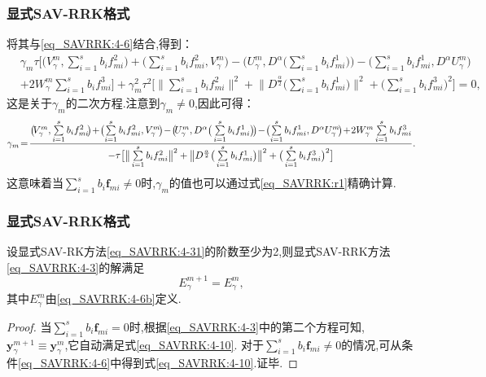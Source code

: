 \documentclass[aspectratio=169]{beamer}
\numberwithin{theorem}{section} %
\begin{document}
\begin{frame}\frametitle{显式SAV-RRK格式}
	将其与\eqref{eq_SAVRRK:4-6}结合,得到：
	\begin{align*}
	&\gamma_m\tau\big[\big(V_{\gamma}^{m},\sum\limits_{i=1}^{s}b_if_{mi}^2\big)+\big(\sum\limits_{i=1}^{s}b_if_{mi}^2,V_{\gamma}^{m}\big)-\big(U_{\gamma}^{m},D^{\alpha}\big(\sum\limits_{i=1}^{s}b_if_{mi}^1\big)\big)-\big(\sum\limits_{i=1}^{s}b_if_{mi}^1, D^{\alpha} U_{\gamma}^{m}\big)\\
	&+2W_{\gamma}^{m}\sum\limits_{i=1}^{s}b_if_{mi}^3\big] +\gamma_m^2\tau^2\big[\big\|\sum\limits_{i=1}^{s}b_if_{mi}^2\big\|^2+ \big\|D^\frac{\alpha}{2}\big(\sum\limits_{i=1}^{s}b_if_{mi}^1\big)\big\|^2+\big(\sum\limits_{i=1}^{s}b_if_{mi}^3\big)^2\big]=0,
	\end{align*}
	这是关于$\gamma_m$的二次方程.注意到$\gamma_m\neq 0$,因此可得：
	\begin{equation}\label{eq_SAVRRK:r1}\small
	\gamma_m \!=\! \frac{\big(\!V_{\gamma}^{m},\sum\limits_{i=1}^{s}b_if_{mi}^2\!\big)\!+\!\big(\!\sum\limits_{i=1}^{s}b_if_{mi}^2,V_{\gamma}^{m}\!\big)\!-\!\big(\!U_{\gamma}^{m},D^{\alpha}\big(\sum\limits_{i=1}^{s}b_if_{mi}^1\big)\!\big)\!-\!\big(\!\sum\limits_{i=1}^{s}b_if_{mi}^1, D^{\alpha} U_{\gamma}^{m}\!\big)\!+\!2W_{\gamma}^{m}\sum\limits_{i=1}^{s}b_if_{mi}^3}{-\tau\big[\big\|\sum\limits_{i=1}^{s}b_if_{mi}^2\big\|^2+\big\|D^\frac{\alpha}{2}\big(\sum\limits_{i=1}^{s}b_if_{mi}^1\big)\big\|^2+\big(\sum\limits_{i=1}^{s}b_if_{mi}^3\big)^2\big]} .
	\end{equation}
	这意味着当$\sum\limits_{i=1}^s b_i \bm{f}_{m i}\neq 0$时,$\gamma_m$的值也可以通过式\eqref{eq_SAVRRK:r1}精确计算.

\end{frame}

\begin{frame}\frametitle{显式SAV-RRK格式}
	\begin{theorem}
		设显式SAV-RK方法\eqref{eq_SAVRRK:4-31}的阶数至少为2,则显式SAV-RRK方法\eqref{eq_SAVRRK:4-3}的解满足
		\begin{equation}
		E_{\gamma}^{m+1}=E_{\gamma}^{m}, \label{eq_SAVRRK:4-10}
		\end{equation}
		其中$E_{\gamma}^{m}$由\eqref{eq_SAVRRK:4-6b}定义.
		\end{theorem}
		
		\begin{proof}
		当$\sum\limits_{i=1}^s b_i \bm{f}_{m i}=0$时,根据\eqref{eq_SAVRRK:4-3}中的第二个方程可知, $\bm{y}_\gamma^{m+1}\equiv\bm{y}_\gamma^m$,它自动满足式\eqref{eq_SAVRRK:4-10}.
		对于$\sum\limits_{i=1}^s b_i \bm{f}_{m i}\neq 0$的情况,可从条件\eqref{eq_SAVRRK:4-6}中得到式\eqref{eq_SAVRRK:4-10}.证毕.
		\end{proof}
\end{frame}
\end{document}
